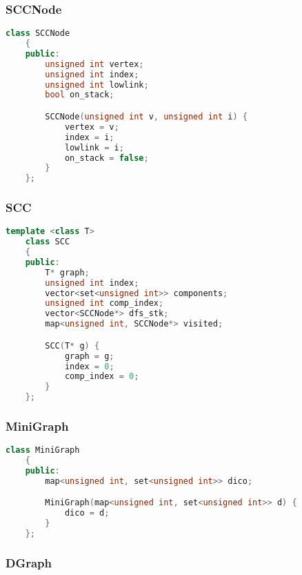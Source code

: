 \subsubsection{SCCNode}

\begin{lstlisting}[language=C++, style=cpp, caption={Defining the SCCNode}, label={lst:cpp-define-sccnode}, firstnumber=1]
    class SCCNode
    {
    public:
        unsigned int vertex;
        unsigned int index;
        unsigned int lowlink;
        bool on_stack;

        SCCNode(unsigned int v, unsigned int i) {
            vertex = v;
            index = i;
            lowlink = i;
            on_stack = false;
        }
    };
\end{lstlisting}

\subsubsection{SCC}

\begin{lstlisting}[language=C++, style=cpp, caption={Defining the SCC}, label={lst:cpp-define-scc}, firstnumber=1]
    template <class T>
    class SCC
    {
    public:
        T* graph;
        unsigned int index;
        vector<set<unsigned int>> components;
        unsigned int comp_index;
        vector<SCCNode*> dfs_stk;
        map<unsigned int, SCCNode*> visited;

        SCC(T* g) {
            graph = g;
            index = 0;
            comp_index = 0;
        }
    };
\end{lstlisting}

\subsubsection{MiniGraph}

\begin{lstlisting}[language=C++, style=cpp, caption={Defining the MiniGraph}, label={lst:cpp-define-mini-graph}, firstnumber=1]
    class MiniGraph
    {
    public:
        map<unsigned int, set<unsigned int>> dico;

        MiniGraph(map<unsigned int, set<unsigned int>> d) {
            dico = d;
        }
    };
\end{lstlisting}

\subsubsection{DGraph}

